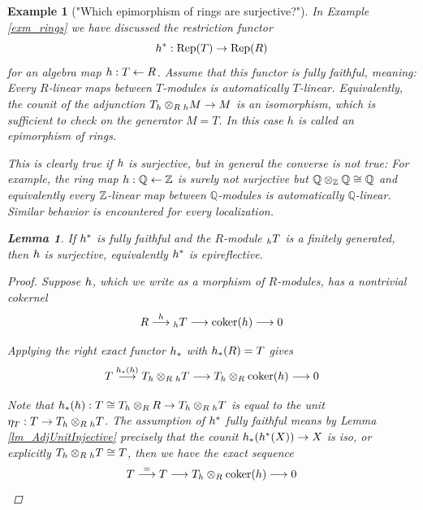 \documentclass[a4paper, reqno]{amsart}
\newtheorem{example}[theorem]{Example}
\newtheorem{lemma}[theorem]{Lemma}
\theoremstyle{introTheorems}
\newcommand{\coker}{\textup{coker}}
\newcommand\Rep{\textup{Rep}}
\renewcommand{\1}{\mathbbold{1}}
\begin{document}
\begin{example}["Which epimorphism of rings are surjective?"]

In Example \ref{exm_rings} we have discussed the restriction functor 
$$\fpullback^*:\Rep(T)\to \Rep(R)$$ 
for an algebra map $h:T\leftarrow R$. Assume that this functor is fully faithful, meaning: Every $R$-linear maps between $T$-modules is  automatically $T$-linear. Equivalently, the counit of the adjunction $T_h\otimes_R {_h}M\to M$ is an isomorphism, which is sufficient to check on the generator $M=T$. In this case $h$ is called an epimorphism of rings.


This is clearly true if $h$ is surjective, but in general the converse is not true: For example, the ring map $h:\mathbb{Q}\leftarrow \mathbb{Z}$ is surely not surjective but $\mathbb{Q}\otimes_{\mathbb{Z}} \mathbb{Q}\cong \mathbb{Q}$ and equivalently every $\mathbb{Z}$-linear map between $\mathbb{Q}$-modules is automatically $\mathbb{Q}$-linear. Similar behavior is encountered for every localization.


\begin{lemma}
   If $h^*$ is fully faithful and the $R$-module ${_h}T$ is a finitely generated, then $h$ is surjective, equivalently $h^*$ is epireflective.
\end{lemma}
\begin{proof}
Suppose $h$, which we write as a morphism of $R$-modules, has a nontrivial cokernel 
%
$$R\stackrel{\fpullback}{\longrightarrow}{_\fpullback}T
\longrightarrow \coker(\fpullback)
\longrightarrow 0$$

Applying the right exact functor $h_*$  with $h_*(R)=T$ gives 
%
$$T\stackrel{\fpullback_*(\fpullback)}{\longrightarrow}T_\fpullback\otimes_R {_\fpullback}T
\longrightarrow T_\fpullback\otimes_R \coker(\fpullback)
\longrightarrow 0$$

Note that $h_*(h):T\cong T_h\otimes_R R\to T_h\otimes_R {_h}T$ is equal to the unit $\eta_{T}:T\to T_h\otimes_R {_h}T$.
The assumption of $h^*$ fully faithful means by Lemma \ref{lm_AdjUnitInjective} precisely that the counit $h_*(h^*(X))\to X$ is iso, or explicitly $T_h\otimes_R {_h}T\cong T$, then we have the exact sequence
%
$$T\stackrel{=}{\longrightarrow} T
\longrightarrow T_\fpullback\otimes_R \coker(\fpullback)
\longrightarrow 0$$


\end{proof}
\end{example}
\end{document}
